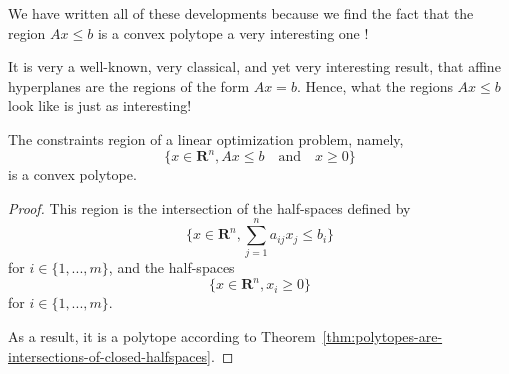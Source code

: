 \begin{remark}
    We have written all of these developments because we find the fact that the region $ Ax \leqslant b $ is a convex polytope a very interesting one !

    It is very a well-known, very classical, and yet very interesting result, that affine hyperplanes are the regions of the form $ Ax = b $. Hence, what the regions $ Ax \leqslant b $ look like is just as interesting!
\end{remark}

\begin{proposition}
    The constraints region of a linear optimization problem, namely,
    \[
        \{ x \in \mathbf R^n, Ax \leqslant b \quad \textrm{and} \quad x \geqslant 0 \}
    \]
    is a convex polytope.
\end{proposition}

\begin{proof}
    This region is the intersection of the half-spaces defined by
    \[
        \{ x \in \mathbf R^n, \sum_{j=1}^n a_{ij} x_j \leqslant b_i \}
    \]
    for $ i \in \{ 1,...,m \} $, and the half-spaces
    \[
        \{ x \in \mathbf R^n, x_i \geqslant 0 \}
    \]
    for $ i \in \{ 1,...,m \} $.

    As a result, it is a polytope according to Theorem~\ref{thm:polytopes-are-intersections-of-closed-halfspaces}.
\end{proof}

